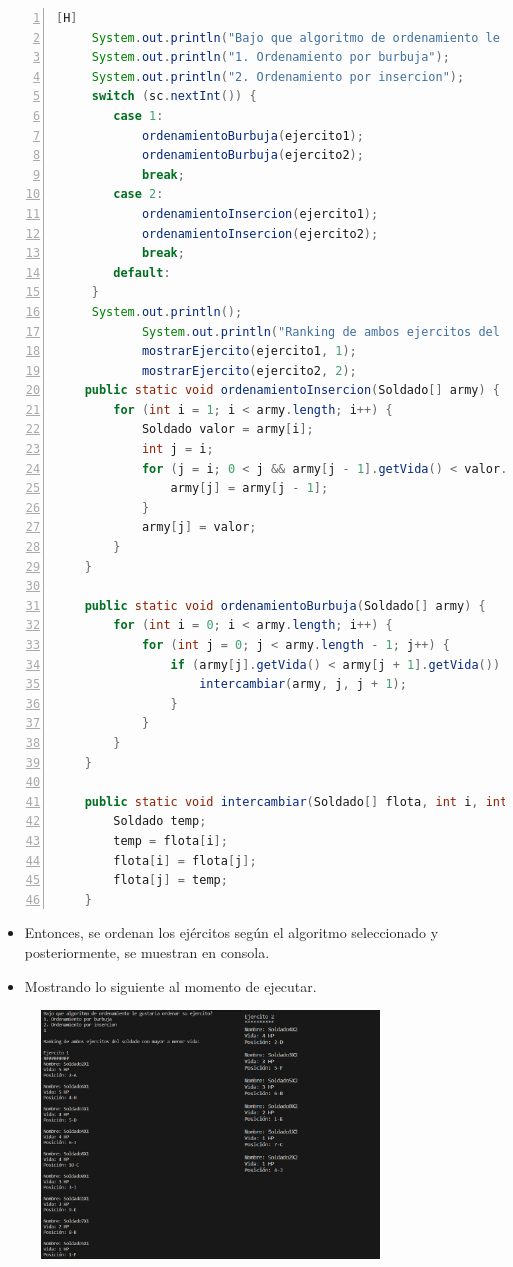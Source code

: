 \documentclass{article}
\begin{document}
	\begin{lstlisting}[language=java,caption={Algoritmos de ordenamiento y ranking}, numbers=left][H]
	 System.out.println("Bajo que algoritmo de ordenamiento le gustaria ordenar su ejercito?");
     System.out.println("1. Ordenamiento por burbuja");
     System.out.println("2. Ordenamiento por insercion");
     switch (sc.nextInt()) {
     	case 1:
     		ordenamientoBurbuja(ejercito1);
       		ordenamientoBurbuja(ejercito2);
            break;
        case 2:
            ordenamientoInsercion(ejercito1);
            ordenamientoInsercion(ejercito2);
            break;
        default:
     }
     System.out.println();
            System.out.println("Ranking de ambos ejercitos del soldado con mayor a menor vida: \n");
            mostrarEjercito(ejercito1, 1);
            mostrarEjercito(ejercito2, 2);
    public static void ordenamientoInsercion(Soldado[] army) {
        for (int i = 1; i < army.length; i++) {
            Soldado valor = army[i];
            int j = i;
            for (j = i; 0 < j && army[j - 1].getVida() < valor.getVida(); j--) {
                army[j] = army[j - 1];
            }
            army[j] = valor;
        }
    }

    public static void ordenamientoBurbuja(Soldado[] army) {
        for (int i = 0; i < army.length; i++) {
            for (int j = 0; j < army.length - 1; j++) {
                if (army[j].getVida() < army[j + 1].getVida()) {
                    intercambiar(army, j, j + 1);
                }
            }
        }
    }

    public static void intercambiar(Soldado[] flota, int i, int j) {
        Soldado temp;
        temp = flota[i];
        flota[i] = flota[j];
        flota[j] = temp;
    }
	\end{lstlisting}
	\begin{itemize}	
		\item Entonces, se ordenan los ejércitos según el algoritmo seleccionado y posteriormente, se muestran en consola.
		\item Mostrando lo siguiente al momento de ejecutar.
	\end{itemize}
	
	\begin{figure}[H]
		\centering
	\includegraphics[width=0.8\textwidth,keepaspectratio]{img/captura4.png}
	\end{figure}
	
\end{document}
